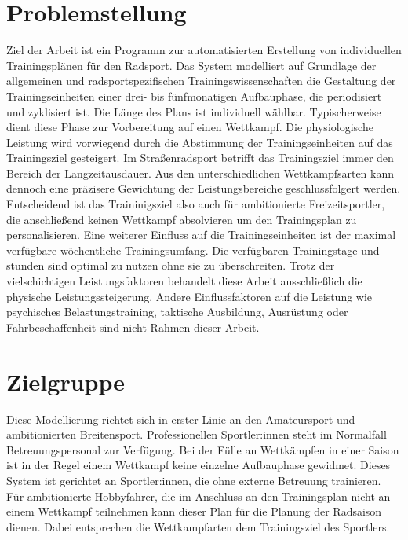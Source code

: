 \section{Problemstellung}
\label{sec:einleitung:problem}
Ziel der Arbeit ist ein Programm zur automatisierten Erstellung von individuellen Trainingsplänen für den Radsport.
Das System modelliert auf Grundlage der allgemeinen und radsportspezifischen Trainingswissenschaften die Gestaltung der Trainingseinheiten einer drei- bis fünfmonatigen Aufbauphase, die periodisiert und zyklisiert ist. Die Länge des Plans ist individuell wählbar.
Typischerweise dient diese Phase zur Vorbereitung auf einen Wettkampf. Die physiologische Leistung wird vorwiegend durch die Abstimmung der Trainingseinheiten auf das Trainingsziel gesteigert. Im Straßenradsport betrifft das Trainingsziel immer den Bereich der Langzeitausdauer. Aus den unterschiedlichen Wettkampfsarten kann dennoch eine präzisere Gewichtung der Leistungsbereiche geschlussfolgert werden. Entscheidend ist das Traininigsziel also auch für ambitionierte Freizeitsportler, die anschließend keinen Wettkampf absolvieren um den Trainingsplan zu personalisieren.\newline
Eine weiterer Einfluss auf die Trainingseinheiten ist der maximal verfügbare wöchentliche Trainingsumfang. Die verfügbaren Trainingstage und -stunden sind optimal zu nutzen ohne sie zu überschreiten. 
Trotz der vielschichtigen Leistungsfaktoren behandelt diese Arbeit ausschließlich die physische Leistungssteigerung. Andere Einflussfaktoren auf die Leistung wie psychisches Belastungstraining, taktische Ausbildung, Ausrüstung oder Fahrbeschaffenheit \cite[13-15]{Radsporttraining} sind nicht Rahmen dieser Arbeit.

\section{Zielgruppe}
Diese Modellierung richtet sich in erster Linie an den Amateursport und ambitionierten Breitensport. Professionellen Sportler:innen steht im Normalfall Betreuungspersonal zur Verfügung. Bei der Fülle an Wettkämpfen in einer Saison ist in der Regel einem Wettkampf keine einzelne Aufbauphase gewidmet. Dieses System ist gerichtet an Sportler:innen, die ohne externe Betreuung trainieren. Für ambitionierte Hobbyfahrer, die im Anschluss an den Trainingsplan nicht an einem Wettkampf teilnehmen kann dieser Plan für die Planung der Radsaison dienen. Dabei entsprechen die Wettkampfarten dem Trainingsziel des Sportlers.

